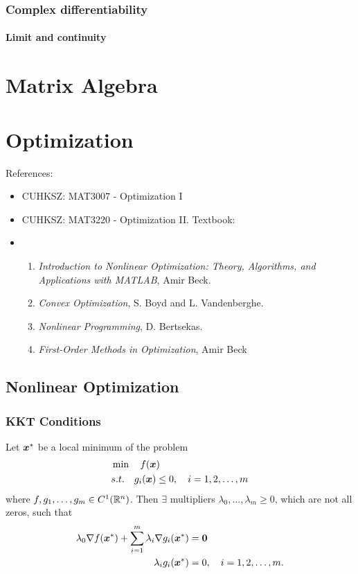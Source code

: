 \documentclass[10pt,a4paper]{book}
\begin{document}
\subsection{Complex differentiability}\label{sec:complex-diff}
\subsubsection{Limit and continuity}

\chapter{Matrix Algebra}\label{chap:mat}




\chapter{Optimization}\label{chap:opt}

References: 
\begin{itemize}
	\item CUHKSZ: MAT3007 - Optimization I
	\item CUHKSZ: MAT3220 - Optimization II. Textbook: 
	\item \begin{enumerate}
		\item \textit{Introduction to Nonlinear Optimization: Theory, Algorithms, and
		Applications with MATLAB}, Amir Beck.
		\item \textit{Convex Optimization}, S. Boyd and L. Vandenberghe.
		\item \textit{Nonlinear Programming}, D. Bertsekas.
		\item \textit{First-Order Methods in Optimization}, Amir Beck
	\end{enumerate}
\end{itemize}

\section{Nonlinear Optimization}\label{sec:nonlinearOPT}
\subsection{KKT Conditions}\label{sec:KKT}
\begin{thmbox}
	\begin{theorem}\label{thm:KKT-FJnecessary}
		Let ${\boldsymbol x}^*$ be a local minimum of the problem
		\begin{align*}
		&\min\quad f({\boldsymbol x})\\
		&s.t.\quad g_i({\boldsymbol x})\leq0,\quad i=1,2,\ldots,m
		\end{align*}
		where $f,g_1,\ldots,g_m\in C^1(\mathbb R^n)$. Then $\exists$ multipliers $\lambda_0,\ldots,\lambda_m\geq 0$, which are not all zeros, such that  
		\begin{align*}
			\lambda_0\nabla f({\boldsymbol x}^*)+\sum_{i=1}^m\lambda_i\nabla g_i({\boldsymbol x}^*)& ={\boldsymbol 0} \\
			\lambda_ig_i({\boldsymbol x}^*)& =0, \quad i=1,2,\ldots,m.
		\end{align*} 
	\end{theorem}	
\end{thmbox}
\end{document}

